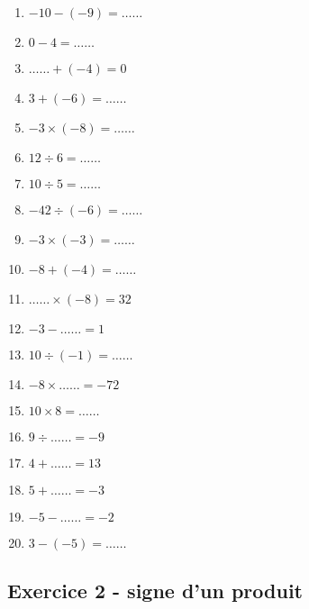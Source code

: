 \begin{multicols}{3}\noindent
    \begin{enumerate}
        \item $-10 - \left( -9\right) = \ldots\ldots$
        \item $0 - 4 = \ldots\ldots$
        \item $\ldots\ldots + \left( -4\right) = 0$
        \item $3 + \left( -6\right) = \ldots\ldots$
        \item $-3 \times \left( -8\right) = \ldots\ldots$
        \item $12 \div 6 = \ldots\ldots$
        \item $10 \div 5 = \ldots\ldots$
        \item $-42 \div \left( -6\right) = \ldots\ldots$
        \item $-3 \times \left( -3\right) = \ldots\ldots$
        \item $-8 + \left( -4\right) = \ldots\ldots$
        \item $\ldots\ldots \times \left( -8\right) = 32$
        \item $-3 - \ldots\ldots = 1$
        \item $10 \div \left( -1\right) = \ldots\ldots$
        \item $-8 \times \ldots\ldots = -72$
        \item $10 \times 8 = \ldots\ldots$
        \item $9 \div \ldots\ldots = -9$
        \item $4 + \ldots\ldots = 13$
        \item $5 + \ldots\ldots = -3$
        \item $-5 - \ldots\ldots = -2$
        \item $3 - \left( -5\right) = \ldots\ldots$
    \end{enumerate}
  \end{multicols}

\subsection*{Exercice 2 - signe d'un produit}

